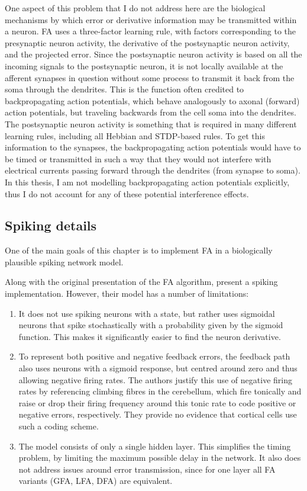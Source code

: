 One aspect of this problem that I do not address here
are the biological mechanisms by which error or derivative information
may be transmitted within a neuron.
FA uses a three-factor learning rule,
with factors corresponding to the presynaptic neuron activity,
the derivative of the postsynaptic neuron activity,
and the projected error.
Since the postsynaptic neuron activity is based on all the incoming signals
to the postsynaptic neuron,
it is not locally available at the afferent synapses in question
without some process to transmit it back from the soma through the dendrites.
This is the function often credited to backpropagating action potentials,
which behave analogously to axonal (forward) action potentials,
but traveling backwards from the cell soma into the dendrites.
The postsynaptic neuron activity is something that is required
in many different learning rules, including all Hebbian and STDP-based rules.
To get this information to the synapses,
the backpropagating action potentials would have to be timed or transmitted
in such a way that they would not interfere with electrical currents passing
forward through the dendrites (from synapse to soma).
In this thesis, I am not modelling backpropagating action potentials explicitly,
thus I do not account for any of these potential interference effects.


\subsection{Spiking details}

One of the main goals of this chapter is to implement FA
in a biologically plausible spiking network model.

Along with the original presentation of the FA algorithm,
\textcite{Lillicrap2014} present a spiking implementation.
However, their model has a number of limitations:
\begin{enumerate}
  \item It does not use spiking neurons with a state,
    but rather uses sigmoidal neurons that spike stochastically
    with a probability given by the sigmoid function.
    This makes it significantly easier to find the neuron derivative.
  \item To represent both positive and negative feedback errors,
    the feedback path also uses neurons with a sigmoid response,
    but centred around zero and thus allowing negative firing rates.
    The authors justify this use of negative firing rates
    by referencing climbing fibres in the cerebellum,
    which fire tonically and raise or drop their firing frequency
    around this tonic rate to code positive or negative errors, respectively.
    They provide no evidence that cortical cells use such a coding scheme.
  \item The model consists of only a single hidden layer.
    This simplifies the timing problem,
    by limiting the maximum possible delay in the network.
    It also does not address issues around error transmission,
    since for one layer all FA variants (GFA, LFA, DFA) are equivalent.
\end{enumerate}

